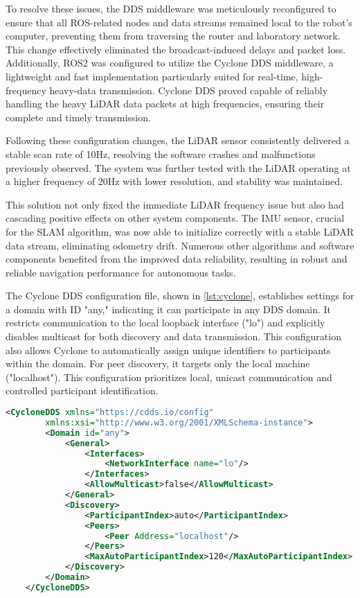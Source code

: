 To resolve these issues, the DDS middleware was meticulously reconfigured to ensure that all ROS-related nodes
and data streams remained local to the robot's computer, preventing them from traversing the router and laboratory network.
This change effectively eliminated the broadcast-induced delays and packet loss.  Additionally, ROS2 was configured
to utilize the Cyclone DDS middleware, a lightweight and fast implementation particularly suited for real-time, 
high-frequency heavy-data transmission. Cyclone DDS proved capable of reliably handling the heavy LiDAR data packets
at high frequencies, ensuring their complete and timely transmission.

Following these configuration changes, the LiDAR sensor consistently delivered a stable scan rate of 10Hz,
resolving the software crashes and malfunctions previously observed. The system was further tested with the
LiDAR operating at a higher frequency of 20Hz with lower resolution, and stability was maintained.

This solution not only fixed the immediate LiDAR frequency issue but also had cascading positive effects on other
system components. The IMU sensor, crucial for the SLAM algorithm, was now able to initialize correctly with a stable
LiDAR data stream, eliminating odometry drift. Numerous other algorithms and software components benefited from the 
improved data reliability, resulting in robust and reliable navigation performance for autonomous tasks.

The Cyclone DDS configuration file, shown in \ref{lst:cyclone}, establishes settings for a domain with ID "any,"
indicating it can participate in any DDS domain. It restricts communication to the local loopback interface ("lo") 
and explicitly disables multicast for both discovery and data transmission. This configuration also allows
Cyclone to automatically assign unique identifiers to participants within the domain. 
For peer discovery, it targets only the local machine ("localhost").
This configuration prioritizes local, unicast communication and controlled participant identification.

\begin{lstlisting}[language=XML, caption=Cyclone DDS configuration file, label=lst:cyclone]
    <CycloneDDS xmlns="https://cdds.io/config" 
        xmlns:xsi="http://www.w3.org/2001/XMLSchema-instance">
        <Domain id="any">
            <General>
                <Interfaces>
                    <NetworkInterface name="lo"/>
                </Interfaces>
                <AllowMulticast>false</AllowMulticast>
            </General>
            <Discovery>
                <ParticipantIndex>auto</ParticipantIndex>
                <Peers>
                    <Peer Address="localhost"/>
                </Peers>
                <MaxAutoParticipantIndex>120</MaxAutoParticipantIndex>
            </Discovery>
        </Domain>
    </CycloneDDS>
\end{lstlisting}


